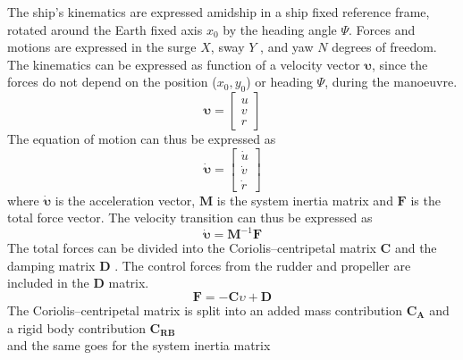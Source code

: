 The ship’s kinematics are expressed amidship in a ship fixed reference frame, rotated around the Earth fixed axis $x_0$ by the heading angle $\Psi$. Forces and motions are expressed in the surge $X$, sway $Y$ , and yaw $N$ degrees of freedom. The kinematics can be expressed as function of a velocity vector $\pmb{\bm{\upsilon}}$, since the forces do not depend on the position ($x_0,y_0$) or heading $\Psi$, during the manoeuvre.
\begin{equation}
    \label{eq:upsilon}
    \pmb{\bm{\upsilon}} = \left[\begin{matrix}u\\v\\r\end{matrix}\right]
\end{equation}
The equation of motion can thus be expressed as
\begin{equation}
    \label{eq:upsilon1d}
    \pmb{\bm{\dot{\upsilon}}} = \left[\begin{matrix}\dot{u}\\\dot{v}\\\dot{r}\end{matrix}\right]
\end{equation}
where $\pmb{\bm{\dot{\upsilon}}}$ is the acceleration vector, $\mathbf{M}$ is the system inertia matrix and $\mathbf{F}$ is the total force vector.
The velocity transition can thus be expressed as
\begin{equation}
    \label{eq:acc}
    \pmb{\bm{\dot{\upsilon}}} = \mathbf{M}^{-1}\mathbf{F}
\end{equation}
The total forces can be divided into the Coriolis–centripetal matrix $\mathbf{C}$ and the damping matrix $\mathbf{D}$ \citep{fossenHandbookMarineCraft2011}. The control forces from the rudder and propeller are included in the $\mathbf{D}$ matrix.
\begin{equation}
    \label{eq:upsilon1d}
\mathbf{F} = - \mathbf{C} \upsilon + \mathbf{D}
\end{equation}
The Coriolis–centripetal matrix is split into an added mass contribution $\mathbf{C_A}$ and a rigid body contribution $\mathbf{C_{RB}}$
\begin{equation}
    \label{eq:C}
    
\end{equation}
and the same goes for the system inertia matrix
\begin{equation}
    \label{eq:M}
    
\end{equation}
